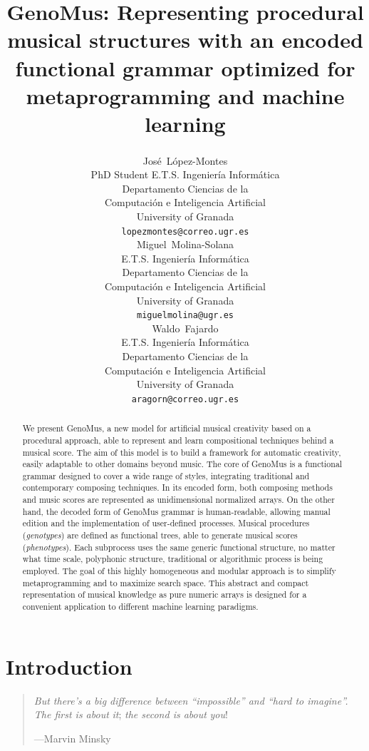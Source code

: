 \documentclass{article}
\title{GenoMus: Representing procedural musical structures with an encoded functional grammar optimized for metaprogramming and machine learning}
\author{
  Jos\'e~L\'opez-Montes\textsuperscript{\faEnvelopeO} \\
  PhD Student E.T.S. Ingenier\'{i}a Inform\'{a}tica\\
  Departamento Ciencias de la\\Computaci\'{o}n e Inteligencia Artificial\\
  University of Granada\\
  \texttt{lopezmontes@correo.ugr.es}\\   
  \And
  Miguel~Molina-Solana \\
  E.T.S. Ingenier\'{i}a Inform\'{a}tica\\
  Departamento Ciencias de la\\Computaci\'{o}n e Inteligencia Artificial\\
  University of Granada\\
  \texttt{miguelmolina@ugr.es} \\ 
  \And
  Waldo~Fajardo \\
  E.T.S. Ingenier\'{i}a Inform\'{a}tica\\
  Departamento Ciencias de la\\Computaci\'{o}n e Inteligencia Artificial\\
  University of Granada\\  
  \texttt{aragorn@correo.ugr.es} \\
}
\begin{document}
\maketitle

\begin{abstract}

 	
We present GenoMus, a new model for artificial musical creativity based on a procedural approach, able to represent and learn compositional techniques behind a musical score. The aim of this model is to build a framework for automatic creativity, easily adaptable to other domains beyond music. The core of GenoMus is a functional grammar designed to cover a wide range of styles, integrating traditional and contemporary composing techniques. In its encoded form, both composing methods and music scores are represented as unidimensional normalized arrays. On the other hand, the decoded form of GenoMus grammar is human-readable, allowing manual edition and the implementation of user-defined processes. Musical procedures (\emph{genotypes}) are defined as functional trees, able to generate musical scores (\emph{phenotypes}). Each subprocess uses the same generic functional structure, no matter what time scale, polyphonic structure, traditional or algorithmic process is being employed. The goal of this highly homogeneous and modular approach is to simplify metaprogramming and to maximize search space. This abstract and compact representation of musical knowledge as pure numeric arrays is designed for a convenient application to different machine learning paradigms. 

\end{abstract}




\setcounter{tocdepth}{2}
\tableofcontents
\bigskip



\section{Introduction}

\begin{samepage}
\begin{quotation}
\textsl{But there's a big difference between ``impossible'' and ``hard to imagine''. The first is about} \emph{it}; \textsl{the second is about} \emph{you}!

---Marvin Minsky \cite{DBLP:journals/aim/Minsky82}
\end{quotation}
\end{samepage}
\end{document}
